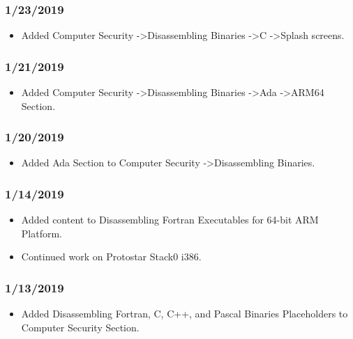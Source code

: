 \subsubsection{1/23/2019}

\begin{itemize}
\item Added Computer Security -\textgreater  Disassembling Binaries -\textgreater  C -\textgreater  Splash screens.
\end{itemize}

\subsubsection{1/21/2019}

\begin{itemize}
\item Added Computer Security -\textgreater  Disassembling Binaries -\textgreater  Ada -\textgreater  ARM64 Section.
\end{itemize}

\subsubsection{1/20/2019}

\begin{itemize}
\item Added Ada Section to Computer Security -\textgreater  Disassembling Binaries.
\end{itemize}

\subsubsection{1/14/2019}

\begin{itemize}
\item Added content to Disassembling Fortran Executables for 64-bit ARM Platform.
\item Continued work on Protostar Stack0 i386.
\end{itemize}

\subsubsection{1/13/2019}

\begin{itemize}
\item Added Disassembling Fortran, C, C++, and Pascal Binaries Placeholders to Computer Security Section.
\end{itemize}

